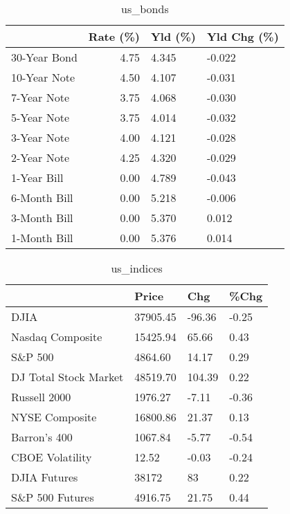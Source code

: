 \documentclass{article}%
\begin{document}
%


\begin{table}[htbp]%
\caption{us\_bonds}%
\centering%
\begin{adjustbox}{width=1\textwidth}%
\begin{tabular}{lrll}
\toprule
             &  Rate (\%) & Yld (\%) & Yld Chg (\%) \\
\midrule
30-Year Bond &      4.75 &   4.345 &      -0.022 \\
10-Year Note &      4.50 &   4.107 &      -0.031 \\
 7-Year Note &      3.75 &   4.068 &      -0.030 \\
 5-Year Note &      3.75 &   4.014 &      -0.032 \\
 3-Year Note &      4.00 &   4.121 &      -0.028 \\
 2-Year Note &      4.25 &   4.320 &      -0.029 \\
 1-Year Bill &      0.00 &   4.789 &      -0.043 \\
6-Month Bill &      0.00 &   5.218 &      -0.006 \\
3-Month Bill &      0.00 &   5.370 &       0.012 \\
1-Month Bill &      0.00 &   5.376 &       0.014 \\
\bottomrule
\end{tabular}
%
\end{adjustbox}%
\end{table}

%


\begin{table}[htbp]%
\caption{us\_indices}%
\centering%
\begin{adjustbox}{width=1\textwidth}%
\begin{tabular}{llll}
\toprule
                      &    Price &    Chg &  \%Chg \\
\midrule
                 DJIA & 37905.45 & -96.36 & -0.25 \\
     Nasdaq Composite & 15425.94 &  65.66 &  0.43 \\
              S\&P 500 &  4864.60 &  14.17 &  0.29 \\
DJ Total Stock Market & 48519.70 & 104.39 &  0.22 \\
         Russell 2000 &  1976.27 &  -7.11 & -0.36 \\
       NYSE Composite & 16800.86 &  21.37 &  0.13 \\
         Barron's 400 &  1067.84 &  -5.77 & -0.54 \\
      CBOE Volatility &    12.52 &  -0.03 & -0.24 \\
         DJIA Futures &    38172 &     83 &  0.22 \\
      S\&P 500 Futures &  4916.75 &  21.75 &  0.44 \\
\bottomrule
\end{tabular}
%
\end{adjustbox}%
\end{table}
\end{document}
